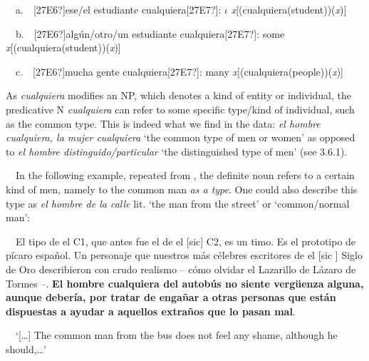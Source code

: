 \begin{styleStandard}
\ \ a.\ \ [27E6?]ese/el estudiante cualquiera[27E7?]: $\iota $ \textit{x}[(cualquiera(student))(\textit{x})]
\end{styleStandard}

\begin{styleStandard}
\ \ b.\ \ [27E6?]algún/otro/un estudiante cualquiera[27E7?]: some \textit{x}[(cualquiera(student))(\textit{x})]
\end{styleStandard}

\begin{styleStandard}
\ \ c.\ \ [27E6?]mucha gente cualquiera[27E7?]: many \textit{x}[(cualquiera(people))(\textit{x})]
\end{styleStandard}

\begin{styleStandard}
As \textit{cualquiera} modifies an NP, which denotes a kind of entity or individual, the predicative N\textit{ cualquiera} can refer to some specific type/kind of individual, such as the common type. This is indeed what we find in the data:\textit{ el hombre cualquiera, la mujer cualquiera} ‘the common type of men or women’ as opposed to \textit{el hombre distinguido/particular} ‘the distinguished type of men’ (see 3.6.1).
\end{styleStandard}

\begin{styleStandard}
\ \ In the following example, repeated from , the definite noun refers to a certain kind of men, namely to the common man \textit{as a type}. One could also describe this type as \textit{el hombre de la calle} lit. ‘the man from the street’ or ‘common/normal man’:
\end{styleStandard}

\begin{styleStandard}
\label{bkm:Ref63545986}\ \ El tipo de el C1, que antes fue el de el [sic] C2, es un timo. Es el prototipo de pícaro español. Un personaje que nuestros más célebres escritores de el [sic ] Siglo de Oro describieron con crudo realismo – cómo olvidar el Lazarillo de Lázaro de Tormes –. \textbf{El hombre cualquiera del autobús no siente vergüenza alguna, aunque debería, por tratar de engañar a otras personas que están dispuestas a ayudar a aquellos extraños que lo pasan mal}.
\end{styleStandard}

\begin{styleStandard}
\ \ ‘[…] The common man from the bus does not feel any shame, although he should,…’
\end{styleStandard}

